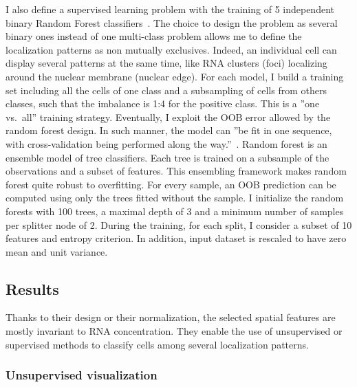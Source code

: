 I also define a supervised learning problem with the training of 5 independent binary Random Forest classifiers~\cite{breiman_random_2001}.
The choice to design the problem as several binary ones instead of one multi-class problem allows me to define the localization patterns as non mutually exclusives.
Indeed, an individual cell can display several patterns at the same time, like \ac{RNA} clusters (foci) localizing around the nuclear membrane (nuclear edge).
For each model, I build a training set including all the cells of one class and a subsampling of cells from others classes, such that the imbalance is 1:4 for the positive class.
This is a ''one vs.\ all'' training strategy.
Eventually, I exploit the \ac{OOB} error allowed by the random forest design.
In such manner, the model can ''be fit in one sequence, with cross-validation being performed along the way.''~\cite{hastie_elements_2009}.
Random forest is an ensemble model of tree classifiers.
Each tree is trained on a subsample of the observations and a subset of features.
This ensembling framework makes random forest quite robust to overfitting.
For every sample, an \ac{OOB} prediction can be computed using only the trees fitted without the sample.
I initialize the random forests with 100 trees, a maximal depth of 3 and a minimum number of samples per splitter node of 2.
During the training, for each split, I consider a subset of 10 features and entropy criterion.
In addition, input dataset is rescaled to have zero mean and unit variance.

\subsection{Results}
\label{subsec:results_general_pattern}

Thanks to their design or their normalization, the selected spatial features are mostly invariant to \ac{RNA} concentration.
They enable the use of unsupervised or supervised methods to classify cells among several localization patterns.

\subsubsection{Unsupervised visualization}

